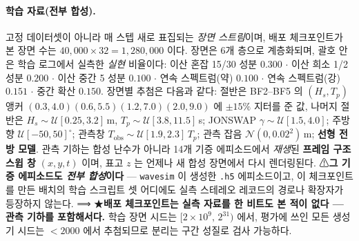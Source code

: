 \documentclass[11pt]{report}
\numberwithin{equation}{chapter}
\numberwithin{figure}{chapter}
\numberwithin{table}{chapter}
\begin{document}
\paragraph{학습 자료(전부 합성).}
고정 데이터셋이 아니라 매 스텝 새로 표집되는 \emph{장면 스트림}이며,
배포 체크포인트가 본 장면 수는 $40{,}000 \times 32 = 1{,}280{,}000$ 이다.
장면은 6개 층으로 계층화되며, 괄호 안은 학습 로그에서 실측한 \emph{실현} 비율이다:
이산 혼잡 15/30 성분 $0.300$ $\cdot$ 이산 희소 1/2 성분 $0.200$ $\cdot$
이산 중간 5 성분 $0.100$ $\cdot$ 연속 스펙트럼(약) $0.100$ $\cdot$
연속 스펙트럼(강) $0.151$ $\cdot$ 중간 확산 $0.150$.
장면별 추첨은 다음과 같다: 절반은 BF2--BF5 의 $(H_s,T_p)$ 앵커
$(0.3,4.0)(0.6,5.5)(1.2,7.0)(2.0,9.0)$ 에 $\pm 15\%$ 지터를 준 값, 나머지 절반은
$H_s \sim \mathcal{U}[0.25,3.2]$\,m, $T_p \sim \mathcal{U}[3.8,11.5]$\,s;
JONSWAP $\gamma \sim \mathcal{U}[1.5,4.0]$; 주방향 $\mathcal{U}[-50,50]^\circ$;
관측창 $T_{\text{obs}} \sim \mathcal{U}[1.9,2.3]\,T_p$;
관측 잡음 $\mathcal{N}(0, 0.02^2)$\,m; \textbf{선형 전방 모델}.
관측 기하는 합성 난수가 아니라 14개 기증 에피소드에서 \emph{재생}된
\textbf{프레임 구조 스윕 창} $(x,y,t)$ 이며, 표고 $z$ 는 언제나 새 합성 장면에서 다시
렌더링된다.
⚠\textbf{그 기증 에피소드도 \emph{전부 합성}이다} --- \texttt{wavesim} 이 생성한
\texttt{.h5} 에피소드이고, 이 체크포인트를 만든 배치의 학습 스크립트 셋 어디에도
실측 스테레오 레코드의 경로나 확장자가 등장하지 않는다.
⟹ ★\textbf{배포 체크포인트는 실측 자료를 한 비트도 본 적이 없다 --- 관측 기하를
포함해서다.}
학습 장면 시드는 $[2\times10^{9},\,2^{31})$ 에서, 평가에 쓰인 모든 생성기 시드는
$<2000$ 에서 추첨되므로 분리는 구간 성질로 검사 가능하다.
\end{document}
